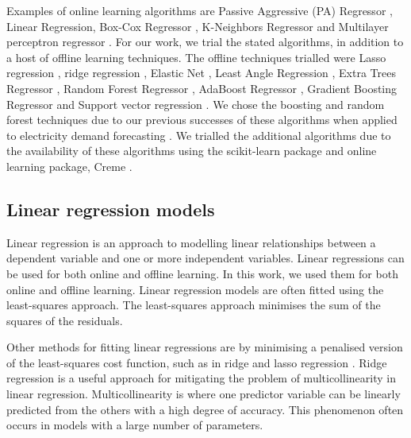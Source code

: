 Examples of online learning algorithms are Passive Aggressive (PA) Regressor \cite{Gzik2014}, Linear Regression, Box-Cox Regressor \cite{Box1964}, K-Neighbors Regressor \cite{forgy65} and Multilayer perceptron regressor \cite{Hinton1989}. For our work, we trial the stated algorithms, in addition to a host of offline learning techniques. The offline techniques trialled were Lasso regression \cite{Tibshirani1996a}, ridge regression \cite{GeladiPaul1994Mrac},  Elastic Net \cite{Geostatistics2010}, Least Angle Regression \cite{Fike1988}, Extra Trees Regressor \cite{Fike1988}, Random Forest Regressor \cite{Breiman2001}, AdaBoost Regressor \cite{Freund1997}, Gradient Boosting Regressor \cite{316} and Support vector regression \cite{Cortes1995}. We chose the boosting and random forest techniques due to our previous successes of these algorithms when applied to electricity demand forecasting \cite{Kell2018a}. We trialled the additional algorithms due to the availability of these algorithms using the scikit-learn package and online learning package, Creme \cite{creme, scikit-learn}. %


\subsection{Linear regression models}


Linear regression is an approach to modelling linear relationships between a dependent variable and one or more independent variables. Linear regressions can be used for both online and offline learning. In this work, we used them for both online and offline learning. Linear regression models are often fitted using the least-squares approach. The least-squares approach minimises the sum of the squares of the residuals. 

Other methods for fitting linear regressions are by minimising a penalised version of the least-squares cost function, such as in ridge and lasso regression \cite{GeladiPaul1994Mrac. Tibshirani1996a}. Ridge regression is a useful approach for mitigating the problem of multicollinearity in linear regression. Multicollinearity is where one predictor variable can be linearly predicted from the others with a high degree of accuracy. This phenomenon often occurs in models with a large number of parameters. 

